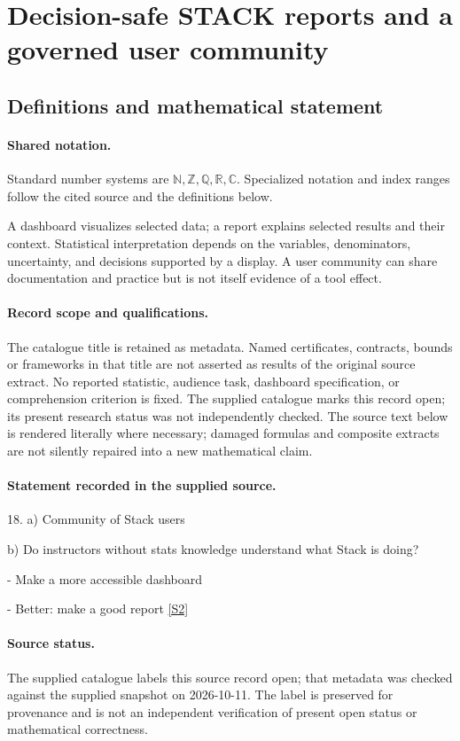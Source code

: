 \documentclass[11pt]{article}
\newcommand{\sref}[2]{\hyperlink{source:#1:#2}{[S#2]}}
\begin{document}
\section{Decision-safe STACK reports and a governed user community}\label{statement}

\subsection{Definitions and mathematical statement}

\paragraph{Shared notation.}Standard number systems are $\mathbb N,\mathbb Z,\mathbb Q,\mathbb R,\mathbb C$. Specialized notation and index ranges follow the cited source and the definitions below.


A dashboard visualizes selected data; a report explains selected results and their context. Statistical interpretation depends on the variables, denominators, uncertainty, and decisions supported by a display. A user community can share documentation and practice but is not itself evidence of a tool effect.
\paragraph{Record scope and qualifications.}
The catalogue title is retained as metadata. Named certificates, contracts, bounds or frameworks in that title are not asserted as results of the original source extract.
No reported statistic, audience task, dashboard specification, or comprehension criterion is fixed. The supplied catalogue marks this record open; its present research status was not independently checked.
The source text below is rendered literally where necessary; damaged formulas and composite extracts are not silently repaired into a new mathematical claim.
\paragraph{Statement recorded in the supplied source.}
18. a) Community of Stack users

b) Do instructors without stats knowledge understand what Stack is doing?

- Make a more accessible dashboard

- Better: make a good report \sref{statement}{2}
\paragraph{Source status.}
The supplied catalogue labels this source record open; that metadata was checked against the supplied snapshot on 2026-10-11. The label is preserved for provenance and is not an independent verification of present open status or mathematical correctness.
\end{document}
